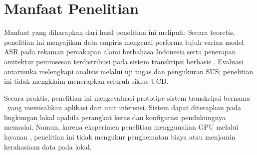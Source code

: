 \section{Manfaat Penelitian}
Manfaat yang diharapkan dari hasil penelitian ini meliputi:
Secara teoretis, penelitian ini menyajikan data empiris mengenai performa tujuh varian model ASR  pada rekaman percakapan alami berbahasa Indonesia serta penerapan arsitektur pemrosesan terdistribusi pada sistem transkripsi berbasis . Evaluasi antarmuka melengkapi analisis melalui uji tugas dan pengukuran SUS; penelitian ini tidak mengklaim menerapkan seluruh siklus UCD.

Secara praktis, penelitian ini mengevaluasi prototipe sistem transkripsi bernama \namasistem\ yang memisahkan aplikasi  dari unit inferensi. Sistem dapat diterapkan pada lingkungan lokal apabila perangkat keras dan konfigurasi pendukungnya memadai. Namun, karena eksperimen penelitian menggunakan GPU melalui layanan , penelitian ini tidak mengukur penghematan biaya atau menjamin kerahasiaan data pada  lokal.